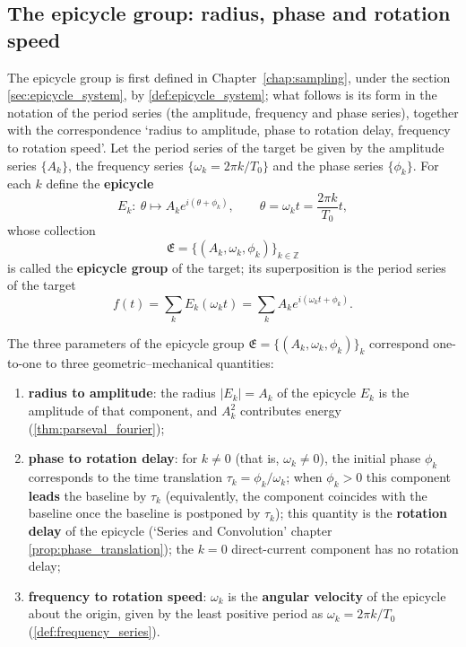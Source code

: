 \subsection{The epicycle group: radius, phase and rotation speed}

\begin{definition}\label{def:ps_epicycle_group}
The epicycle group is first defined in Chapter~\ref{chap:sampling}, under the section \cref{sec:epicycle_system}, by \cref{def:epicycle_system}; what follows is its form in the notation of the period series (the amplitude, frequency and phase series), together with the correspondence `radius to amplitude, phase to rotation delay, frequency to rotation speed'.
Let the period series of the target be given by the amplitude series $\{A_k\}$, the frequency series $\{\omega_k=2\pi k/T_0\}$ and the phase series $\{\phi_k\}$. For each $k$ define the \textbf{epicycle}
\[
E_k:\ \theta\mapsto A_ke^{i(\theta+\phi_k)},\qquad \theta=\omega_kt=\frac{2\pi k}{T_0}t,
\]
whose collection
\[
\mathfrak{E}=\{(A_k,\omega_k,\phi_k)\}_{k\in\mathbb{Z}}
\]
is called the \textbf{epicycle group} of the target; its superposition is the period series of the target
\[
f(t)=\sum_kE_k(\omega_kt)=\sum_kA_ke^{i(\omega_kt+\phi_k)}.
\]
\end{definition}

\begin{proposition}\label{prop:ps_epicycle_correspondence}
The three parameters of the epicycle group $\mathfrak{E}=\{(A_k,\omega_k,\phi_k)\}_{k}$ correspond one-to-one to three geometric--mechanical quantities:
\begin{enumerate}[label=(\roman*)]
    \item \textbf{radius to amplitude}: the radius $|E_k|=A_k$ of the epicycle $E_k$ is the amplitude of that component, and $A_k^2$ contributes energy (\cref{thm:parseval_fourier});
    \item \textbf{phase to rotation delay}: for $k\ne0$ (that is, $\omega_k\ne0$), the initial phase $\phi_k$ corresponds to the time translation $\tau_k=\phi_k/\omega_k$; when $\phi_k>0$ this component \textbf{leads} the baseline by $\tau_k$ (equivalently, the component coincides with the baseline once the baseline is postponed by $\tau_k$); this quantity is the \textbf{rotation delay} of the epicycle (`Series and Convolution' chapter \cref{prop:phase_translation}); the $k=0$ direct-current component has no rotation delay;
    \item \textbf{frequency to rotation speed}: $\omega_k$ is the \textbf{angular velocity} of the epicycle about the origin, given by the least positive period as $\omega_k=2\pi k/T_0$ (\cref{def:frequency_series}).
\end{enumerate}
\end{proposition}

